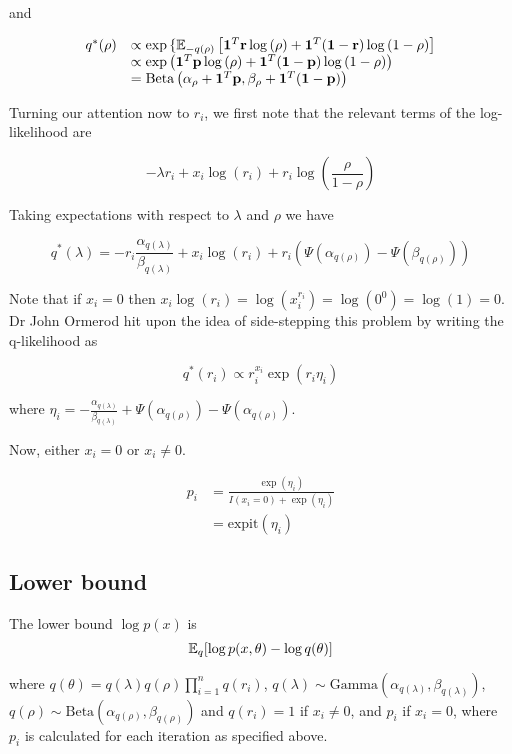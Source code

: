 \documentclass{amsart}
\begin{document}
and

$$
\begin{array}{ll}
q^*(\rho) &\propto \exp{\{ {\mathbb E}_{-q(\rho)} \left[ {\bf1}^T{\bf r}\log{(\rho)} + {\bf1}^T({\bf1}- {\bf r}) \log{(1 - \rho)} \right] } \\
&\propto \exp{ \left( {\bf1}^T{\bf p}\log{(\rho)} + {\bf1}^T({\bf1}- {\bf p}) \log{(1 - \rho)} \right) } \\
&= {\text{Beta} \left( \alpha_\rho + {\bf 1}^T{\bf p}, \beta_\rho + {\bf 1}^T({\bf 1} - {\bf p}) \right)}
\end{array}
$$

Turning our attention now to $r_i$, we first note that the relevant terms of the
log-likelihood are

$$
-\lambda r_i + x_i \log{(r_i)} + r_i \log{\left(\frac{\rho}{1 - \rho}\right)}
$$

Taking expectations with respect to $\lambda$ and $\rho$ we have

$$
q^*(\lambda) = -r_i \frac{\alpha_{q(\lambda)}}{\beta_{q(\lambda)}} + x_i \log{(r_i)} + r_i (\Psi(\alpha_{q(\rho)}) - \Psi(\beta_{q(\rho)}))
$$

Note that if $x_i = 0$ then
$x_i \log{(r_i)} = \log{(x_i^{r_i})} = \log{(0^0)} = \log{(1)} = 0$. Dr John Ormerod hit
upon the idea of side-stepping this problem by writing the q-likelihood as

$$
q^*(r_i) \propto r_i^{x_i} \exp{(r_i \eta_i)}
$$

where $\eta_i = - \frac{\alpha_{q(\lambda)}}{\beta_{q(\lambda)}} + \Psi(\alpha_{q(\rho)}) - \Psi(\alpha_{q(\rho)})$.

Now, either $x_i = 0$ or $x_i \ne 0$.

$$
\begin{array}{ll}
p_i &= \frac{\exp{(\eta_i)}}{I(x_i = 0) + \exp{(\eta_i)}} \\
&= \text{expit}(\eta_i)
\end{array}
$$

\subsection{Lower bound}
The lower bound $\log{p(x)}$ is
$$
	{\mathbb E}_q[\log{p(x, \theta)} - \log{q(\theta)}]
$$

where $q(\theta) = q(\lambda) q(\rho) \prod_{i=1}^n q(r_i)$,
$q(\lambda) \sim \text{Gamma}{(\alpha_{q(\lambda)}, \beta_{q(\lambda)})}$,
$q(\rho) \sim \text{Beta}(\alpha_{q(\rho)}, \beta_{q(\rho)})$ and
$q(r_i) = 1$ if $x_i \ne 0$, and $p_i$ if $x_i = 0$, where $p_i$ is
calculated for each iteration as specified above.
\end{document}
